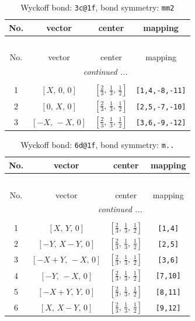 \documentclass[fleqn,8pt]{jsarticle}
\begin{document}
\renewcommand{\arraystretch}{1.2}
\begin{longtable}{cccc}
\caption{Wyckoff bond: {\tt 3c@1f}, bond symmetry: {\tt mm2}}
 \\
 \hline \hline
No. & vector & center & mapping \\ \hline \endfirsthead

\multicolumn{3}{l}{\tablename\ \thetable{}} \\
 \hline \hline
No. & vector & center & mapping \\ \hline \endhead

 \hline \hline
\multicolumn{3}{r}{\footnotesize\it continued ...} \\ \endfoot

 \hline \hline
\multicolumn{3}{r}{} \\ \endlastfoot

1 & $\left[ X,\, 0,\, 0 \right]$ & $\left[ \frac{2}{3},\, \frac{1}{3},\, \frac{1}{2} \right]$ & {\tt [1,4,-8,-11]} \\ \hline
2 & $\left[ 0,\, X,\, 0 \right]$ & $\left[ \frac{2}{3},\, \frac{1}{3},\, \frac{1}{2} \right]$ & {\tt [2,5,-7,-10]} \\ \hline
3 & $\left[ - X,\, - X,\, 0 \right]$ & $\left[ \frac{2}{3},\, \frac{1}{3},\, \frac{1}{2} \right]$ & {\tt [3,6,-9,-12]} \\
\end{longtable}
\renewcommand{\arraystretch}{1.2}
\begin{longtable}{cccc}
\caption{Wyckoff bond: {\tt 6d@1f}, bond symmetry: {\tt m..}}
 \\
 \hline \hline
No. & vector & center & mapping \\ \hline \endfirsthead

\multicolumn{3}{l}{\tablename\ \thetable{}} \\
 \hline \hline
No. & vector & center & mapping \\ \hline \endhead

 \hline \hline
\multicolumn{3}{r}{\footnotesize\it continued ...} \\ \endfoot

 \hline \hline
\multicolumn{3}{r}{} \\ \endlastfoot

1 & $\left[ X,\, Y,\, 0 \right]$ & $\left[ \frac{2}{3},\, \frac{1}{3},\, \frac{1}{2} \right]$ & {\tt [1,4]} \\ \hline
2 & $\left[ - Y,\, X - Y,\, 0 \right]$ & $\left[ \frac{2}{3},\, \frac{1}{3},\, \frac{1}{2} \right]$ & {\tt [2,5]} \\ \hline
3 & $\left[ - X + Y,\, - X,\, 0 \right]$ & $\left[ \frac{2}{3},\, \frac{1}{3},\, \frac{1}{2} \right]$ & {\tt [3,6]} \\ \hline
4 & $\left[ - Y,\, - X,\, 0 \right]$ & $\left[ \frac{2}{3},\, \frac{1}{3},\, \frac{1}{2} \right]$ & {\tt [7,10]} \\ \hline
5 & $\left[ - X + Y,\, Y,\, 0 \right]$ & $\left[ \frac{2}{3},\, \frac{1}{3},\, \frac{1}{2} \right]$ & {\tt [8,11]} \\ \hline
6 & $\left[ X,\, X - Y,\, 0 \right]$ & $\left[ \frac{2}{3},\, \frac{1}{3},\, \frac{1}{2} \right]$ & {\tt [9,12]} \\
\end{longtable}
\end{document}
